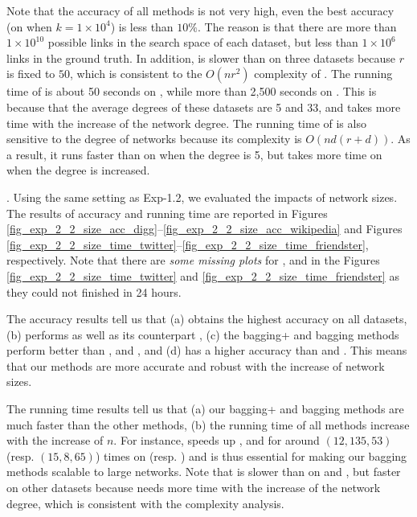 Note that the accuracy of all methods is not very high, even the best
accuracy (\Biasedp on \Digg when $k = 1\times 10^4$) is less than $10\%$. The reason is that
there are more than $1\times 10^{10}$ possible links in the search space of each dataset,
but less than $1\times 10^6$ links in the ground truth.
In addition, \NMF is slower than \Aa on three datasets because $r$ is fixed to $50$,
which is consistent to the $O(nr^2)$ complexity of \NMF.
The running time of \Aa is about 50 seconds on \YouTube,
while more than 2,500 seconds on \Wikipedia.
This is because that the average degrees of these datasets are 5 and 33,
and \Aa takes more time with the increase of the network degree.
The running time of \BIGCLAM is also sensitive to the degree of networks because its complexity is $O(nd(r + d))$.
As a result, it runs faster than
\NMF on \YouTube when the degree is 5, but takes more time on \Wikipedia
when the degree is increased.








. Using the same setting as Exp-1.2, we
evaluated the impacts of network sizes. The results of accuracy and running time
are reported in Figures \ref{fig_exp_2_2_size_acc_digg}--\ref{fig_exp_2_2_size_acc_wikipedia}
and Figures \ref{fig_exp_2_2_size_time_twitter}--\ref{fig_exp_2_2_size_time_friendster}, respectively.
Note that there are {\em some missing plots} for \NMF, \Aa and
\BIGCLAM in the Figures \ref{fig_exp_2_2_size_time_twitter} and
\ref{fig_exp_2_2_size_time_friendster} as they could not finished in 24 hours.



The accuracy results tell us that (a) \Biased obtains the highest accuracy on all
datasets, (b) \Biasedp performs as well as its counterpart \Biased,
(c) the bagging+ and bagging methods perform better than \NMF, \Aa and \BIGCLAM,
and (d) \NMF has a higher accuracy than \Aa and \BIGCLAM. This means that
our methods are more accurate and robust with the increase of network sizes.

The running time results tell us that (a) our bagging+ and bagging methods are much faster than the other methods,
(b) the running time of all methods increase with the increase of $n$. For
instance, \Biasedp speeds up \NMF, \Aa and \BIGCLAM for around $(12, 135, 53)$ (resp. $(15, 8, 65)$)
times on \Twitter (resp. \Friendster) and is thus essential for
making our bagging methods scalable to large networks. Note
that \NMF is slower than \BIGCLAM on \Digg and \YouTube,
but faster on other datasets because \BIGCLAM needs more time with
the increase of the network degree, which is consistent with the complexity analysis.



